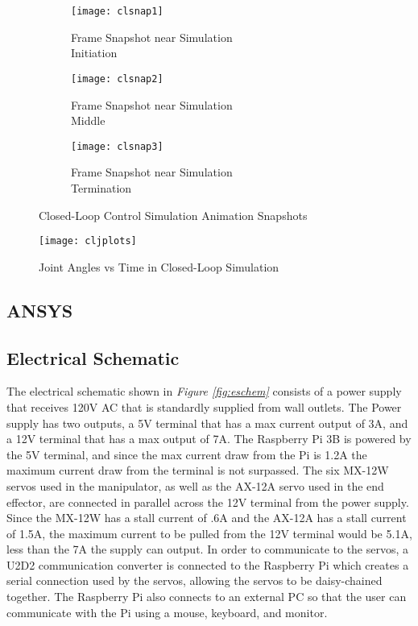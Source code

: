 \begin{figure}[htp]
  \center
  \begin{subfigure}[c]{0.33\textwidth}
    \center
    \texttt{[image: clsnap1]}
    \caption{Frame Snapshot near Simulation \\Initiation}
  \end{subfigure}%
  \begin{subfigure}[c]{0.33\textwidth}
    \center
    \texttt{[image: clsnap2]}
    \caption{Frame Snapshot near Simulation \\Middle}
  \end{subfigure}%
\begin{subfigure}[c]{0.33\textwidth}
  \center
  \texttt{[image: clsnap3]}
  \caption{Frame Snapshot near Simulation \\Termination}
\end{subfigure}
  \caption{Closed-Loop Control Simulation Animation Snapshots}
  \label{fig:clsnaps}
\end{figure}
\begin{figure}[htp]
  \center
  \texttt{[image: cljplots]}
  \caption{Joint Angles vs Time in Closed-Loop Simulation}
  \label{fig:cljplots}
\end{figure}


\newpage
\subsection{ANSYS}
\newpage
\subsection{Electrical Schematic}
The electrical schematic shown in \emph{Figure \ref{fig:eschem}} consists of a power supply that receives 120V AC that is standardly supplied from wall outlets. The Power supply has two outputs, a 5V terminal that has a max current output of 3A, and a 12V terminal that has a max output of 7A. The Raspberry Pi 3B is powered by the 5V terminal, and since the max current draw from the Pi is 1.2A the maximum current draw from the terminal is not surpassed. The six MX-12W servos used in the manipulator, as well as the AX-12A servo used in the end effector, are connected in parallel across the 12V terminal from the power supply. Since the MX-12W has a stall current of .6A and the AX-12A has a stall current of 1.5A, the maximum current to be pulled from the 12V terminal would be 5.1A, less than the 7A the supply can output. In order to communicate to the servos, a U2D2 communication converter is connected to the Raspberry Pi which creates a serial connection used by the servos, allowing the servos to be daisy-chained together. The Raspberry Pi also connects to an external PC so that the user can communicate with the Pi using a mouse, keyboard, and monitor.

